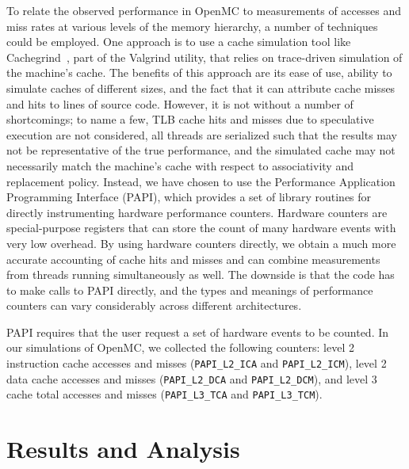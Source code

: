 \documentclass{mc2015}
\begin{document}
To relate the observed performance in OpenMC to measurements of accesses and
miss rates at various levels of the memory hierarchy, a number of techniques
could be employed. One approach is to use a cache simulation tool like
Cachegrind~\cite{cachegrind}, part of the Valgrind utility, that relies on
trace-driven simulation of the machine's cache. The benefits of this approach
are its ease of use, ability to simulate caches of different sizes, and the
fact that it can attribute cache misses and hits to lines of source
code. However, it is not without a number of shortcomings; to name a few, TLB
cache hits and misses due to speculative execution are not considered, all
threads are serialized such that the results may not be representative of the
true performance, and the simulated cache may not necessarily match the
machine's cache with respect to associativity and replacement policy. Instead,
we have chosen to use the Performance Application Programming Interface (PAPI),
which provides a set of library routines for directly instrumenting hardware
performance counters. Hardware counters are special-purpose registers that can
store the count of many hardware events with very low overhead. By using
hardware counters directly, we obtain a much more accurate accounting of cache
hits and misses and can combine measurements from threads running
simultaneously as well. The downside is that the code has to make calls to PAPI
directly, and the types and meanings of performance counters can vary
considerably across different architectures.

PAPI requires that the user request a set of hardware events to be counted. In
our simulations of OpenMC, we collected the following counters: level 2
instruction cache accesses and misses (\texttt{PAPI\_L2\_ICA} and
\texttt{PAPI\_L2\_ICM}), level 2 data cache accesses and misses
(\texttt{PAPI\_L2\_DCA} and \texttt{PAPI\_L2\_DCM}), and level 3 cache total
accesses and misses (\texttt{PAPI\_L3\_TCA} and \linebreak \texttt{PAPI\_L3\_TCM}).

\section{Results and Analysis}
\end{document}
